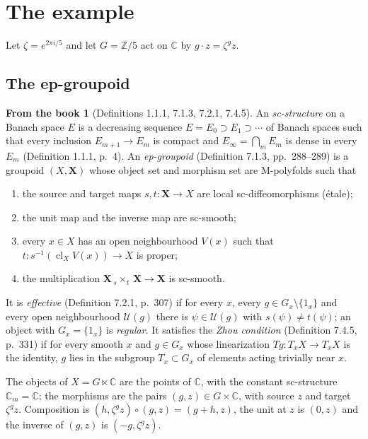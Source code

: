 \documentclass[11pt,a4paper]{article}
\theoremstyle{plain}
\theoremstyle{definition}
\newtheorem{recall}[theorem]{From the book}
\theoremstyle{remark}
\newcommand{\C}{\mathbb{C}}
\newcommand{\Z}{\mathbb{Z}}
\newcommand{\ZZ}{\Z/5}
\newcommand{\cl}{\operatorname{cl}}
\begin{document}
\section{The example}\label{sec:example}

Let $\zeta=e^{2\pi i/5}$ and let $G=\ZZ$ act on $\C$ by $g\cdot z=\zeta^g z$.

\subsection{The ep-groupoid}

\begin{recall}[Definitions 1.1.1, 7.1.3, 7.2.1, 7.4.5]\label{rec:epgroupoid}
An \emph{sc-structure} on a Banach space $E$ is a decreasing sequence $E=E_0\supset E_1\supset\cdots$
of Banach spaces such that every inclusion $E_{m+1}\to E_m$ is compact and $E_\infty=\bigcap_m E_m$ is
dense in every $E_m$ (Definition 1.1.1, p.~4). An \emph{ep-groupoid} (Definition 7.1.3, pp.~288--289)
is a groupoid $(X,\mathbf X)$ whose object set and morphism set are M-polyfolds such that
\begin{enumerate}[label=(\arabic*)]
\item the source and target maps $s,t\colon\mathbf X\to X$ are local sc-diffeomorphisms (étale);
\item the unit map and the inverse map are sc-smooth;
\item every $x\in X$ has an open neighbourhood $V(x)$ such that $t\colon s^{-1}(\cl_X V(x))\to X$ is
  proper;
\item the multiplication $\mathbf X\,{}_s{\times}_t\,\mathbf X\to\mathbf X$ is sc-smooth.
\end{enumerate}
It is \emph{effective} (Definition 7.2.1, p.~307) if for every $x$, every $g\in G_x\setminus\{1_x\}$ and
every open neighbourhood $\mathcal U(g)$ there is $\psi\in\mathcal U(g)$ with $s(\psi)\neq t(\psi)$; an
object with $G_x=\{1_x\}$ is \emph{regular}. It satisfies the \emph{Zhou condition} (Definition 7.4.5,
p.~331) if for every smooth $x$ and $g\in G_x$ whose linearization $Tg\colon T_xX\to T_xX$ is the
identity, $g$ lies in the subgroup $T_x\subset G_x$ of elements acting trivially near $x$.
\end{recall}

The objects of $X=G\ltimes\C$ are the points of $\C$, with the constant sc-structure $\C_m=\C$; the
morphisms are the pairs $(g,z)\in G\times\C$, with source $z$ and target $\zeta^g z$. Composition is
$(h,\zeta^g z)\circ(g,z)=(g+h,z)$, the unit at $z$ is $(0,z)$ and the inverse of $(g,z)$ is
$(-g,\zeta^g z)$.
\end{document}
